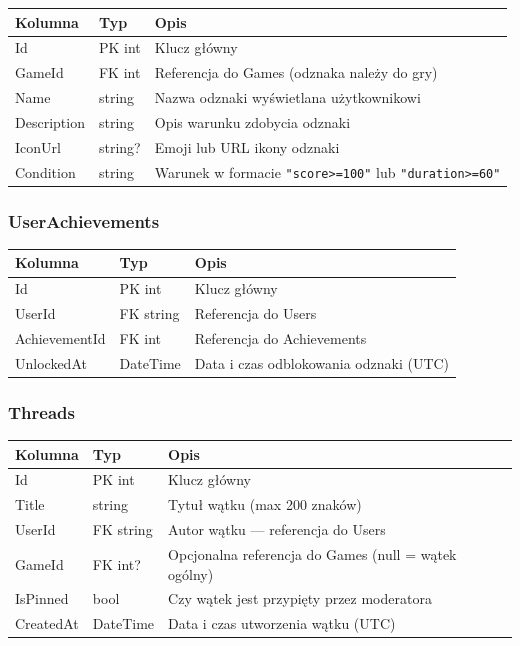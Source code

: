 \documentclass[12pt,a4paper]{article}
\begin{document}
\begin{longtable}{>{\ttfamily}p{3.5cm} p{3cm} p{7cm}}
  \toprule
  \normalfont\textbf{Kolumna} & \textbf{Typ} & \textbf{Opis} \\
  \midrule
  \endhead
  Id          & PK int    & Klucz główny \\[3pt]
  GameId      & FK int    & Referencja do Games (odznaka należy do gry) \\[3pt]
  Name        & string    & Nazwa odznaki wyświetlana użytkownikowi \\[3pt]
  Description & string    & Opis warunku zdobycia odznaki \\[3pt]
  IconUrl     & string?   & Emoji lub URL ikony odznaki \\[3pt]
  Condition   & string    & Warunek w formacie \texttt{"score>=100"} lub \texttt{"duration>=60"} \\
  \bottomrule
\end{longtable}

\subsubsection{UserAchievements}

\begin{longtable}{>{\ttfamily}p{3.5cm} p{3cm} p{7cm}}
  \toprule
  \normalfont\textbf{Kolumna} & \textbf{Typ} & \textbf{Opis} \\
  \midrule
  \endhead
  Id            & PK int    & Klucz główny \\[3pt]
  UserId        & FK string & Referencja do Users \\[3pt]
  AchievementId & FK int    & Referencja do Achievements \\[3pt]
  UnlockedAt    & DateTime  & Data i czas odblokowania odznaki (UTC) \\
  \bottomrule
\end{longtable}

\subsubsection{Threads}

\begin{longtable}{>{\ttfamily}p{3.5cm} p{3cm} p{7cm}}
  \toprule
  \normalfont\textbf{Kolumna} & \textbf{Typ} & \textbf{Opis} \\
  \midrule
  \endhead
  Id        & PK int    & Klucz główny \\[3pt]
  Title     & string    & Tytuł wątku (max 200 znaków) \\[3pt]
  UserId    & FK string & Autor wątku --- referencja do Users \\[3pt]
  GameId    & FK int?   & Opcjonalna referencja do Games (null = wątek ogólny) \\[3pt]
  IsPinned  & bool      & Czy wątek jest przypięty przez moderatora \\[3pt]
  CreatedAt & DateTime  & Data i czas utworzenia wątku (UTC) \\
  \bottomrule
\end{longtable}
\end{document}
